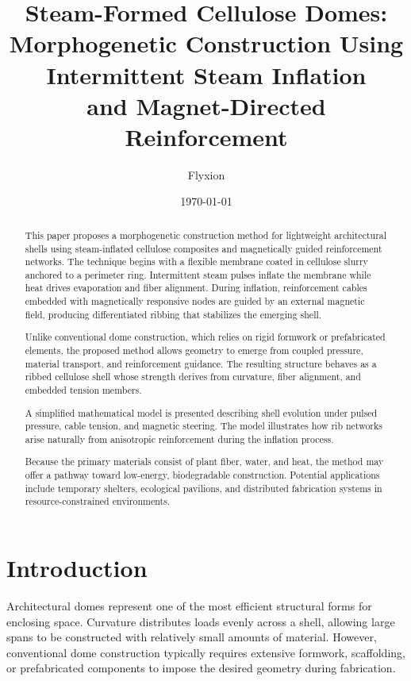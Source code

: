 \documentclass[12pt,a4paper]{article}
\title{Steam-Formed Cellulose Domes:\\
Morphogenetic Construction Using Intermittent Steam Inflation\\
and Magnet-Directed Reinforcement}
\author{Flyxion}
\date{\today}
\begin{document}
\maketitle

\begin{abstract}
This paper proposes a morphogenetic construction method for lightweight
architectural shells using steam-inflated cellulose composites and
magnetically guided reinforcement networks. The technique begins with a
flexible membrane coated in cellulose slurry anchored to a perimeter
ring. Intermittent steam pulses inflate the membrane while heat drives
evaporation and fiber alignment. During inflation, reinforcement cables
embedded with magnetically responsive nodes are guided by an external
magnetic field, producing differentiated ribbing that stabilizes the
emerging shell.

Unlike conventional dome construction, which relies on rigid formwork
or prefabricated elements, the proposed method allows geometry to
emerge from coupled pressure, material transport, and reinforcement
guidance. The resulting structure behaves as a ribbed cellulose shell
whose strength derives from curvature, fiber alignment, and embedded
tension members.

A simplified mathematical model is presented describing shell evolution
under pulsed pressure, cable tension, and magnetic steering. The model
illustrates how rib networks arise naturally from anisotropic
reinforcement during the inflation process.

Because the primary materials consist of plant fiber, water, and heat,
the method may offer a pathway toward low-energy, biodegradable
construction. Potential applications include temporary shelters,
ecological pavilions, and distributed fabrication systems in
resource-constrained environments.
\end{abstract}

\tableofcontents
\newpage

\section{Introduction}

Architectural domes represent one of the most efficient structural forms
for enclosing space. Curvature distributes loads evenly across a shell,
allowing large spans to be constructed with relatively small amounts of
material. However, conventional dome construction typically requires
extensive formwork, scaffolding, or prefabricated components to impose
the desired geometry during fabrication.
\end{document}
